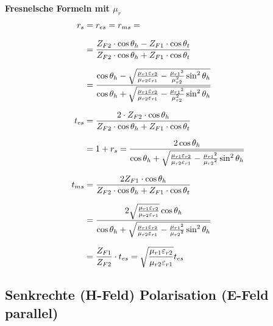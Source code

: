 \textbf{Fresnelsche Formeln mit $\mu_r$}
\begin{equation*}
	\setlength{\jot}{10pt}
	\begin{aligned}
		r_s    & =  r_{es} = r_{ms} =                                                                                                                                            \\
		& = \frac{Z_{F2} \cdot \cos \theta_h-Z_{F1} \cdot \cos \theta_t}{Z_{F2} \cdot \cos \theta_h+Z_{F1} \cdot \cos \theta_t}                                           \\
        & =\frac{\cos \theta_h-\sqrt{\frac{\mu_{r 1} \varepsilon_{r 2}}{\mu_{r 2} \varepsilon_{r 1}}-\frac{\mu_{r 1}{ }^2}{\mu_{r 2}^2} \sin ^2 \theta_h}}{\cos \theta_h+\sqrt{\frac{\mu_{r 1} \varepsilon_{r 2}}{\mu_{r 2} \varepsilon_{r 1}}-\frac{\mu_{r 1}{ }^2}{\mu_{r 2}^2} \sin ^2 \theta_h}} \\
		t_{es} & =\frac{2 \cdot	 Z_{F2} \cdot \cos \theta_h}{Z_{F2} \cdot \cos \theta_h+Z_{F1} \cdot \cos \theta_t}                                                              \\
        & = 1+r_s =\frac{2 \cos \theta_h}{\cos \theta_h+\sqrt{\frac{\mu_{r 1} \varepsilon_{r 2}}{\mu_{r 2} \varepsilon_{r 1}}-\frac{\mu_{r 1}{ }^2}{\mu_{r 2}{ }^2} \sin ^2 \theta_h}} \\
		t_{ms} & = \frac{2 Z_{F1} \cdot \cos \theta_h}{Z_{F2} \cdot \cos \theta_h+Z_{F1} \cdot \cos \theta_t}                                                              \\
		& =\frac{2 \sqrt{\frac{\mu_{r 1} \varepsilon_{r 2}}{\mu_{r 2} \varepsilon_{r 1}}} \cos \theta_h}{\cos \theta_h+\sqrt{\frac{\mu_{r 1} \varepsilon_{r 2}}{\mu_{r 2} \varepsilon_{r 1}}-\frac{\mu_{r 1}{ }^2}{\mu_{r 2}{ }^2} \sin ^2 \theta_h}}
		\\
		& = \frac{Z_{F1}}{Z_{F2}}\cdot t_{es} =\sqrt{\frac{\mu_{r 1} \varepsilon_{r 2}}{\mu_{r 2} \varepsilon_{r 1}}} t_{e s}                                                                                                                   
	\end{aligned}
\end{equation*}


\subsection{Senkrechte (H-Feld) Polarisation (E-Feld parallel) }
\begin{center}

\end{center}

